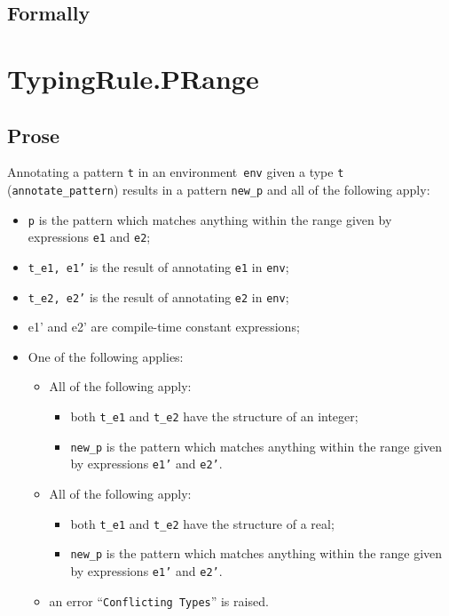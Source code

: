 \documentclass{book}
\begin{document}
\begin{emptyformal}
    \subsection{Formally}
\end{emptyformal}

 
\section{TypingRule.PRange \label{sec:TypingRule.PRange}}

    \subsection{Prose}
   Annotating a pattern \texttt{t} in an environment~\texttt{env} given a type \texttt{t} (\texttt{annotate\_pattern}) results in a pattern \texttt{new\_p} and all of the following apply:
   \begin{itemize}
   \item \texttt{p} is the pattern which matches anything within the range given by
      expressions \texttt{e1} and \texttt{e2};
   \item \texttt{t\_e1, e1'} is the result of annotating \texttt{e1} in \texttt{env};
   \item \texttt{t\_e2, e2'} is the result of annotating \texttt{e2} in \texttt{env};
   \item e1' and e2' are compile-time constant expressions; 
   \item One of the following applies:
     \begin{itemize}
     \item All of the following apply:
           \begin{itemize}
           \item both \texttt{t\_e1} and \texttt{t\_e2} have the structure of an integer;
           \item \texttt{new\_p} is the pattern which matches anything within the range given by
      expressions \texttt{e1'} and \texttt{e2'}.
           \end{itemize}
     \item All of the following apply:
           \begin{itemize}
           \item both \texttt{t\_e1} and \texttt{t\_e2} have the structure of a real;
           \item \texttt{new\_p} is the pattern which matches anything within the range given by
      expressions \texttt{e1'} and \texttt{e2'}.
           \end{itemize}
     \item an error ``\texttt{Conflicting Types}'' is raised.
     \end{itemize}
   \end{itemize}
\end{document}
